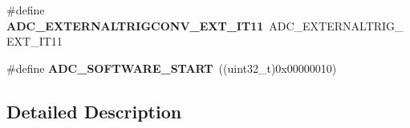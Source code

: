 \begin{DoxyCompactItemize}
\item 
\hypertarget{group___a_d_c___external__trigger__source___regular_gaded75d5ddcb64cf735044cdc753571a9}{\#define {\bfseries A\-D\-C\-\_\-\-E\-X\-T\-E\-R\-N\-A\-L\-T\-R\-I\-G\-C\-O\-N\-V\-\_\-\-E\-X\-T\-\_\-\-I\-T11}~A\-D\-C\-\_\-\-E\-X\-T\-E\-R\-N\-A\-L\-T\-R\-I\-G\-\_\-\-E\-X\-T\-\_\-\-I\-T11}\label{group___a_d_c___external__trigger__source___regular_gaded75d5ddcb64cf735044cdc753571a9}

\item 
\hypertarget{group___a_d_c___external__trigger__source___regular_ga349ec6a1c2a362fba718cbfd068e50dc}{\#define {\bfseries A\-D\-C\-\_\-\-S\-O\-F\-T\-W\-A\-R\-E\-\_\-\-S\-T\-A\-R\-T}~((uint32\-\_\-t)0x00000010)}\label{group___a_d_c___external__trigger__source___regular_ga349ec6a1c2a362fba718cbfd068e50dc}

\end{DoxyCompactItemize}


\subsection{Detailed Description}

